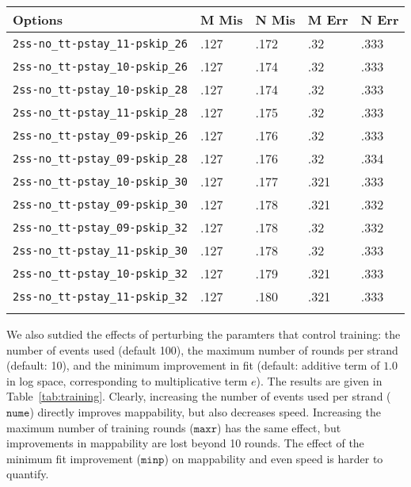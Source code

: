 \documentclass{bioinfo}
\begin{document}
\begin{table}[!t]
{
\begin{tabular}{@{}lllll@{}}
\toprule
Options & M Mis & N Mis & M Err & N Err \\
\midrule
\texttt{2ss-no\_tt-pstay\_11-pskip\_26}  &  .127  &  .172  &  .32   &  .333  \\
\texttt{2ss-no\_tt-pstay\_10-pskip\_26}  &  .127  &  .174  &  .32   &  .333  \\
\texttt{2ss-no\_tt-pstay\_10-pskip\_28}  &  .127  &  .174  &  .32   &  .333  \\
\texttt{2ss-no\_tt-pstay\_11-pskip\_28}  &  .127  &  .175  &  .32   &  .333  \\
\texttt{2ss-no\_tt-pstay\_09-pskip\_26}  &  .127  &  .176  &  .32   &  .333  \\
\texttt{2ss-no\_tt-pstay\_09-pskip\_28}  &  .127  &  .176  &  .32   &  .334  \\
\texttt{2ss-no\_tt-pstay\_10-pskip\_30}  &  .127  &  .177  &  .321  &  .333  \\
\texttt{2ss-no\_tt-pstay\_09-pskip\_30}  &  .127  &  .178  &  .321  &  .332  \\
\texttt{2ss-no\_tt-pstay\_09-pskip\_32}  &  .127  &  .178  &  .32   &  .332  \\
\texttt{2ss-no\_tt-pstay\_11-pskip\_30}  &  .127  &  .178  &  .32   &  .333  \\
\texttt{2ss-no\_tt-pstay\_10-pskip\_32}  &  .127  &  .179  &  .321  &  .333  \\
\texttt{2ss-no\_tt-pstay\_11-pskip\_32}  &  .127  &  .180  &  .321  &  .333  \\
\botrule
\end{tabular}
}
{}
\end{table}

We also sutdied the effects of perturbing the paramters that control training: the number of events used (default 100), the maximum number of rounds per strand (default: 10), and the minimum improvement in fit (default: additive term of $1.0$ in log space, corresponding to multiplicative term $e$). The results are given in Table~\ref{tab:training}. Clearly, increasing the number of events used per strand ($\texttt{nume}$) directly improves mappability, but also decreases speed. Increasing the maximum number of training rounds ($\texttt{maxr}$) has the same effect, but improvements in mappability are lost beyond 10 rounds. The effect of the minimum fit improvement ($\texttt{minp}$) on mappability and even speed is harder to quantify.
\end{document}
